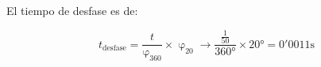 \documentclass[spanish,openany]{report}
\begin{document}
 El tiempo de desfase es de:

\[t_{\text{desfase}} = \frac{t}{\upvarphi_{360}}\times\upvarphi_{20} \to 
\frac{\frac{1}{50}}{\ang{360}}\times\ang{20} = 0'0011\si{\second}
\]

\end{document}
